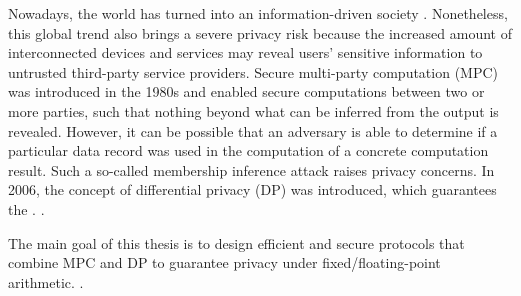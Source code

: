 Nowadays, the world has turned into an information-driven society . Nonetheless, this global trend also brings a severe privacy risk because the increased amount of interconnected devices and services may reveal users' sensitive information to untrusted third-party service providers. Secure multi-party computation (MPC) was introduced in the 1980s and enabled secure computations between two or more parties, such that nothing beyond what can be inferred from the output is revealed. However, it can be possible that an adversary is able to determine if a particular data record was used in the computation of a concrete computation result. Such a so-called membership inference attack raises privacy concerns. In 2006, the concept of differential privacy (DP) was introduced, which guarantees the . . 


The main goal of this thesis is to design efficient and secure protocols that combine MPC and DP to guarantee privacy under fixed/floating-point arithmetic. . 